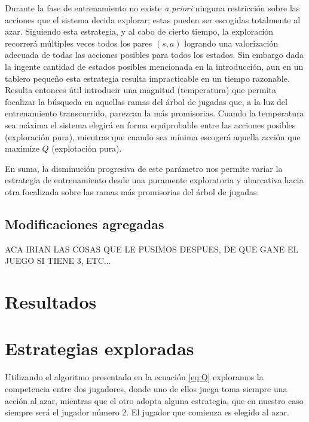 \documentclass[11pt, spanish]{article}
\begin{document}
\par Durante la fase de entrenamiento no existe \emph{a priori} ninguna 
restricción sobre las acciones que el sistema decida explorar; estas pueden ser 
escogidas totalmente al azar. Siguiendo esta estrategia, y al cabo de 
cierto tiempo, la exploración recorrerá múltiples veces todos los pares 
$(s,a)$ logrando una valorización adecuada de todas las acciones posibles para 
todos los estados. Sin embargo dada la ingente cantidad de estados posibles 
mencionada en la introducción, aun en un tablero pequeño esta estrategia 
resulta impracticable en un tiempo razonable. Resulta entonces útil introducir 
una magnitud (temperatura) que permita focalizar la búsqueda en aquellas ramas 
del árbol de jugadas que, a la luz del entrenamiento transcurrido, parezcan la 
más promisorias. Cuando la temperatura sea máxima el sistema elegirá en forma 
equiprobable entre las acciones posibles (exploración pura), mientras que 
cuando sea mínima escogerá aquella acción que maximize $Q$ (explotación pura).
\par En suma, la disminución progresiva de este parámetro nos permite variar la 
estrategia de entrenamiento desde una puramente exploratoria y abarcativa hacia 
otra focalizada sobre las ramas más promisorias del árbol de jugadas.

\subsection{Modificaciones agregadas}
ACA IRIAN LAS COSAS QUE LE PUSIMOS DESPUES, DE QUE GANE EL JUEGO SI TIENE 3, ETC...

\section{Resultados}

\section{Estrategias exploradas}
\par Utilizando el algoritmo presentado en la ecuación \ref{eq:Q} exploramos la competencia entre dos jugadores, donde uno de ellos juega toma siempre una acción al azar, mientras que el otro adopta alguna estrategia, que en nuestro caso siempre será el jugador número 2. El jugador que comienza es elegido al azar.
\end{document}
